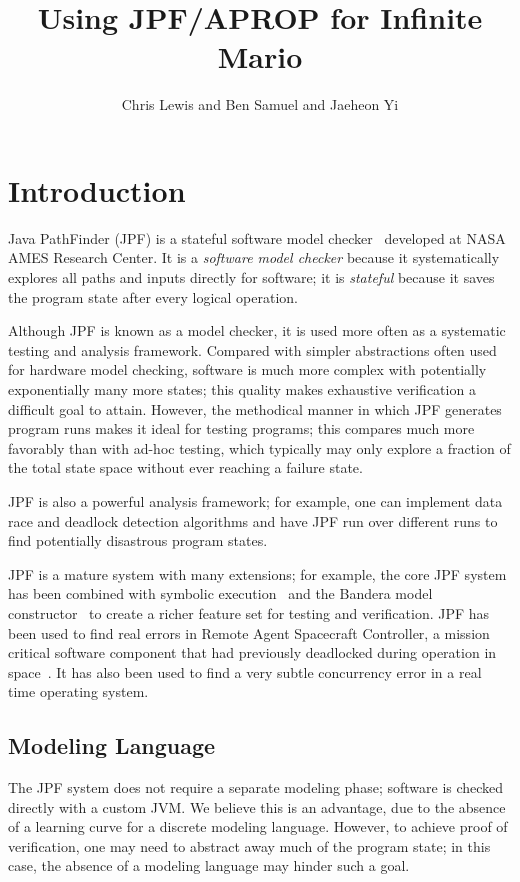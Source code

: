 \documentclass[twocolumn]{article}
\title{Using JPF/APROP for Infinite Mario}
\author{Chris Lewis and Ben Samuel and Jaeheon Yi}
\begin{document}
\maketitle

\section{Introduction}
Java PathFinder (JPF) is a stateful software model checker~\cite{DBLP:journals/ase/VisserHBPL03} developed at NASA AMES Research Center. 
It is a \emph{software model checker} because it systematically explores all paths and inputs directly for software;
it is \emph{stateful} because it saves the program state after every logical operation. 

Although JPF is known as a model checker, it is used more often as a systematic testing and analysis framework. 
Compared with simpler abstractions often used for hardware model checking, software is much more complex with potentially exponentially many more states;
this quality makes exhaustive verification a difficult goal to attain. 
However, the methodical manner in which JPF generates program runs makes it ideal for testing programs; 
this compares much more favorably than with ad-hoc testing, which typically may only explore a fraction of the total state space without ever reaching a failure state. 

JPF is also a powerful analysis framework; for example, one can implement data race and deadlock detection algorithms and have JPF run over different runs to find potentially disastrous program states. 

JPF is a mature system with many extensions; for example, the core JPF system has been combined with symbolic execution~\cite{DBLP:conf/tacas/AnandPV07} and the Bandera model constructor~\cite{DBLP:conf/fmoods/Dwyer02} to create a richer feature set for testing and verification. 
JPF has been used to find real errors in Remote Agent Spacecraft Controller, a mission critical software component that had previously deadlocked during operation in space~\cite{DBLP:journals/ase/VisserHBPL03}. 
It has also been used to find a very subtle concurrency error in a real time operating system\cite{DBLP:journals/ase/VisserHBPL03}. 

\subsection{Modeling Language}

The JPF system does not require a separate modeling phase; software is checked directly with a custom JVM. 
We believe this is an advantage, due to the absence of a learning curve for a discrete modeling language. 
However, to achieve proof of verification, one may need to abstract away much of the program state; 
in this case, the absence of a modeling language may hinder such a goal. 
\end{document}
